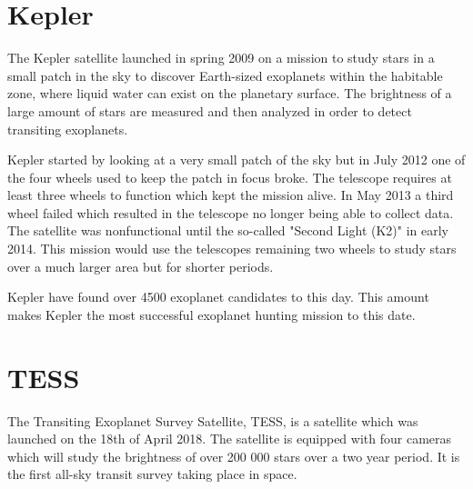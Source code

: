 \documentclass[12pt]{report}
\begin{document}
\section{Kepler}
	The Kepler satellite launched in spring 2009 on a mission to study stars in a small patch in the sky to discover Earth-sized exoplanets within the habitable zone, where liquid water can exist on the planetary surface. The brightness of a large amount of stars are measured and then analyzed in order to detect transiting exoplanets. 
	
	Kepler started by looking at a very small patch of the sky but in July 2012 one of the four wheels used to keep the patch in focus broke. The telescope requires at least three wheels to function which kept the mission alive. In May 2013 a third wheel failed which resulted in the telescope no longer being able to collect data. The satellite was nonfunctional until the so-called "Second Light (K2)" in early 2014. This mission would use the telescopes remaining two wheels to study stars over a much larger area but for shorter periods. \citep{2017PAPhS.161...38B}
	
	Kepler have found over 4500 exoplanet candidates \citep{2017PAPhS.161...38B} to this day. This amount makes Kepler the most successful exoplanet hunting mission to this date.
	
	
\section{TESS}
	The Transiting Exoplanet Survey Satellite, TESS, is a satellite which was launched on the 18th of April 2018. The satellite is equipped with four cameras which will study the brightness of over 200 000 stars over a two year period. It is the first all-sky transit survey taking place in space. \citep{2014SPIE.9143E..20R}
	
\end{document}

